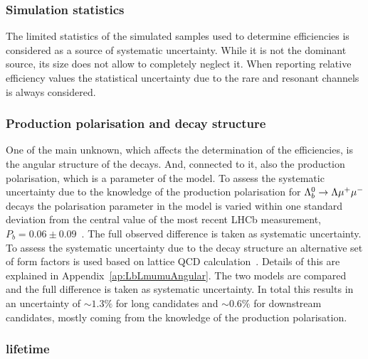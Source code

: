 \subsubsection{Simulation statistics}

The limited statistics of the simulated samples used to determine efficiencies is considered as a source of systematic uncertainty.
While it is not the dominant source, its size does not allow to completely neglect it.
When reporting relative efficiency values the statistical uncertainty due to the  rare and resonant channels
is always considered. 

\subsubsection{Production polarisation and decay structure}
\label{sec:BRpolsys}

One of the main unknown, which affects the determination of the efficiencies, is the angular structure of
the decays. And, connected to it, also the production polarisation, which is a parameter of the model.
%
To assess the systematic uncertainty due to the knowledge of the production polarisation for $\Lambda^0_b\rightarrow\Lambda\mu^+\mu^-$ decays
the polarisation parameter in the model is varied within one standard deviation from the central value of the
most recent LHCb measurement, $P_b = 0.06 \pm 0.09$~\cite{Aaij:2013oxa}. The full observed difference is
taken as systematic uncertainty. To assess the systematic uncertainty due to the decay structure
an alternative set of form factors is used based on lattice QCD calculation~\cite{Detmold:2012vy}.
Details of this are explained in Appendix~\ref{ap:LbLmumuAngular}. The two models are compared and the full difference
is taken as systematic uncertainty.
%
In total this results in an uncertainty of $\sim 1.3\%$ for long candidates and $\sim 0.6\%$ for downstream
candidates, mostly coming from the knowledge of the production polarisation.

\subsubsection{\Lb lifetime}

